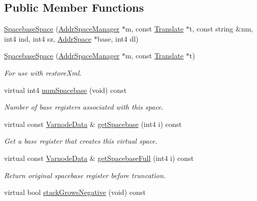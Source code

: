 \subsection*{Public Member Functions}
\begin{DoxyCompactItemize}
\item 
\mbox{\hyperlink{class_spacebase_space_af5ba3d56a61942f1b4978d711e4cf844}{Spacebase\+Space}} (\mbox{\hyperlink{class_addr_space_manager}{Addr\+Space\+Manager}} $\ast$m, const \mbox{\hyperlink{class_translate}{Translate}} $\ast$t, const string \&nm, int4 ind, int4 sz, \mbox{\hyperlink{class_addr_space}{Addr\+Space}} $\ast$base, int4 dl)
\item 
\mbox{\hyperlink{class_spacebase_space_a8754e42b3db0e9b5df5e8003b881d15b}{Spacebase\+Space}} (\mbox{\hyperlink{class_addr_space_manager}{Addr\+Space\+Manager}} $\ast$m, const \mbox{\hyperlink{class_translate}{Translate}} $\ast$t)
\begin{DoxyCompactList}\small\item\em For use with restore\+Xml. \end{DoxyCompactList}\item 
virtual int4 \mbox{\hyperlink{class_spacebase_space_a4d1969883a570388a7e071af0b943f0e}{num\+Spacebase}} (void) const
\begin{DoxyCompactList}\small\item\em Number of base registers associated with this space. \end{DoxyCompactList}\item 
virtual const \mbox{\hyperlink{struct_varnode_data}{Varnode\+Data}} \& \mbox{\hyperlink{class_spacebase_space_af8f5c5b9da9bd74ef022bd0c5c18c2ea}{get\+Spacebase}} (int4 i) const
\begin{DoxyCompactList}\small\item\em Get a base register that creates this virtual space. \end{DoxyCompactList}\item 
virtual const \mbox{\hyperlink{struct_varnode_data}{Varnode\+Data}} \& \mbox{\hyperlink{class_spacebase_space_aa6c1b1af9de6666ff998996d647ff44d}{get\+Spacebase\+Full}} (int4 i) const
\begin{DoxyCompactList}\small\item\em Return original spacebase register before truncation. \end{DoxyCompactList}\item 
virtual bool \mbox{\hyperlink{class_spacebase_space_abade76813d5936d68f715cfde95a764c}{stack\+Grows\+Negative}} (void) const

\end{DoxyCompactItemize}
